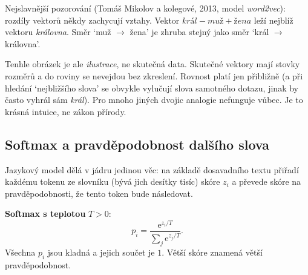 Nejslavnější pozorování (Tomáš Mikolov a kolegové, 2013, model \textit{word2vec}): rozdíly vektorů někdy zachycují vztahy. Vektor $\textit{král} - \textit{muž} + \textit{žena}$ leží nejblíž vektoru \textit{královna}. Směr `muž $\to$ žena' je zhruba stejný jako směr `král $\to$ královna'.

\begin{center}
\end{center}

Tenhle obrázek je ale \textit{ilustrace}, ne skutečná data. Skutečné vektory mají stovky rozměrů a do roviny se nevejdou bez zkreslení. Rovnost platí jen přibližně (a při hledání `nejbližšího slova' se obvykle vylučují slova samotného dotazu, jinak by často vyhrál sám \textit{král}). Pro mnoho jiných dvojic analogie nefunguje vůbec. Je to krásná intuice, ne zákon přírody.

\subsection{Softmax a pravděpodobnost dalšího slova}

Jazykový model dělá v jádru jedinou věc: na základě dosavadního textu přiřadí každému tokenu ze slovníku (bývá jich desítky tisíc) skóre $z_i$ a převede skóre na pravděpodobnosti, že tento token bude následovat.

\begin{definitionbox}
  \textbf{Softmax s teplotou} $T > 0$:
  \begin{equation*}
    p_i = \frac{\mathrm{e}^{z_i/T}}{\sum_j\mathrm{e}^{z_j/T}}.
  \end{equation*}
  Všechna $p_i$ jsou kladná a jejich součet je $1$. Větší skóre znamená větší pravděpodobnost.
\end{definitionbox}


